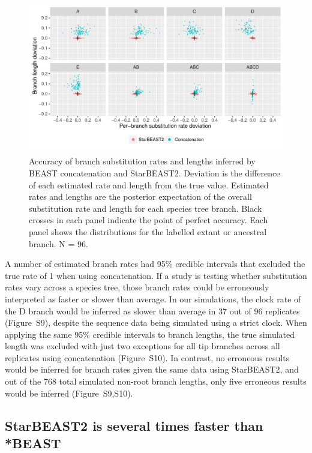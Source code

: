 \documentclass[nogrid]{MBE}%
\begin{document}
\begin{figure}[htb!]
\centering
\includegraphics[width=\textwidth]{scatter.pdf}
\caption
{Accuracy of branch substitution rates and lengths inferred by BEAST
concatenation and StarBEAST2. Deviation is the difference of each estimated
rate and length from the true value. Estimated rates and lengths are the posterior
expectation of the overall substitution rate and length for each species tree
branch. Black crosses in each panel indicate the point of perfect accuracy. Each
panel shows the distributions for the labelled extant or ancestral branch. N =
96.}
\label{fig:spilsRates}
\end{figure}

A number of estimated branch rates had 95\% credible intervals that excluded the
true rate of 1 when using concatenation. If a study is testing whether
substitution rates vary across a species tree, those branch rates could be
erroneously interpreted as faster or slower than average. In our simulations,
the clock rate of the D branch would be inferred as slower than average in 37
out of 96 replicates (Figure~S9), despite the sequence data being simulated
using a strict clock. When applying the same 95\% credible intervals to branch
lengths, the true simulated length was excluded with just two exceptions for
all tip branches across all replicates using concatenation (Figure~S10). In
contrast, no erroneous results would be inferred for branch rates given the same
data using StarBEAST2, and out of the 768 total simulated non-root branch
lengths, only five erroneous results would be inferred (Figure~S9,S10).

\subsection{StarBEAST2 is several times faster than *BEAST}
\end{document}
